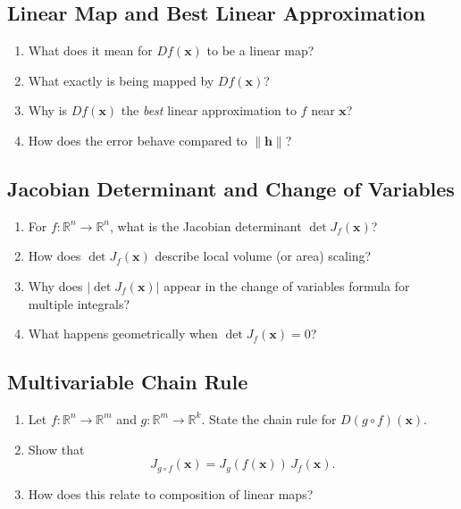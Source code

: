 \subsection{Linear Map and Best Linear Approximation}

\begin{enumerate}[resume]
  \item What does it mean for $Df(\mathbf{x})$ to be a linear map?
  \item What exactly is being mapped by $Df(\mathbf{x})$?
  \item Why is $Df(\mathbf{x})$ the \emph{best} linear approximation to $f$ near $\mathbf{x}$?
  \item How does the error behave compared to $\|\mathbf{h}\|$?
\end{enumerate}

\subsection{Jacobian Determinant and Change of Variables}

\begin{enumerate}[resume]
  \item For $f : \mathbb{R}^n \to \mathbb{R}^n$, what is the Jacobian determinant $\det J_f(\mathbf{x})$?
  \item How does $\det J_f(\mathbf{x})$ describe local volume (or area) scaling?
  \item Why does $|\det J_f(\mathbf{x})|$ appear in the change of variables formula for multiple integrals?
  \item What happens geometrically when $\det J_f(\mathbf{x}) = 0$?
\end{enumerate}

\subsection{Multivariable Chain Rule}

\begin{enumerate}[resume]
  \item Let $f : \mathbb{R}^n \to \mathbb{R}^m$ and $g : \mathbb{R}^m \to \mathbb{R}^k$. State the chain rule for $D(g \circ f)(\mathbf{x})$.
  \item Show that
    \[
      J_{g \circ f}(\mathbf{x}) = J_g(f(\mathbf{x})) \, J_f(\mathbf{x}).
    \]
  \item How does this relate to composition of linear maps?
\end{enumerate}

